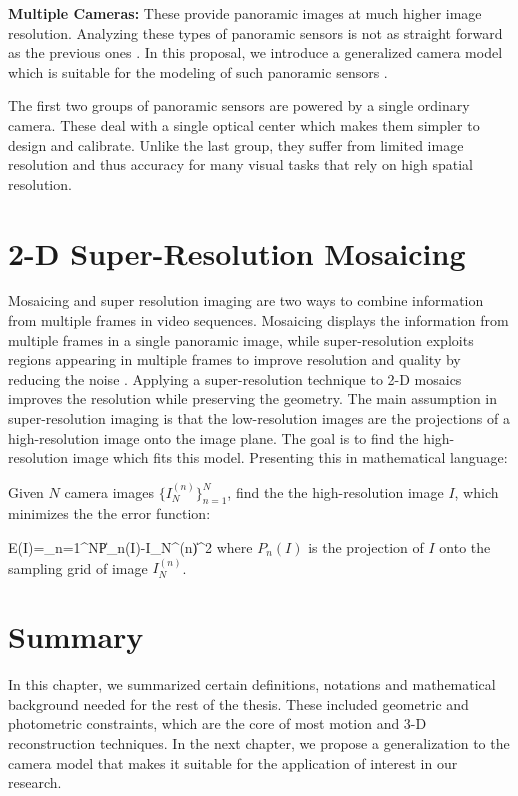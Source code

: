 \item {\bf Multiple Cameras:} These provide panoramic images at much higher image resolution.
Analyzing these types of panoramic sensors is not as straight forward as the previous ones
\cite{bak01,bak00,fer00,fir03-2,gro01,mcc97,nal98,neg01,ple03,swa00}. In this proposal, we
introduce a generalized camera model which is suitable for the modeling of such panoramic sensors
\cite{fir03-2}.

\ei

The first two groups of panoramic sensors are powered by a single ordinary camera. These deal with
a single optical center which makes them simpler to design and calibrate. Unlike the last group,
they suffer from limited image resolution and thus accuracy for many visual tasks that rely on
high spatial resolution.

\section{2-D Super-Resolution Mosaicing} Mosaicing and super resolution imaging are two ways
to combine information from multiple frames in video sequences. Mosaicing displays the information
from multiple frames in a single panoramic image, while super-resolution exploits regions appearing
in multiple frames to improve resolution and quality by reducing the noise \cite{zom00,zom01-1}.
Applying a super-resolution technique to 2-D mosaics improves the resolution while preserving the
geometry. The main assumption in super-resolution imaging is that the low-resolution images are the
projections of a high-resolution image onto the image plane. The goal is to find the
high-resolution image which fits this model. Presenting this in mathematical language:

Given $N$ camera images $\{I_N^{(n)}\}^N_{n=1}$, find the the high-resolution image $I$, which
minimizes the the error function:

\beq \D E(I)=\sum_{n=1}^N\left\|P_n(I)-I_N^{(n)}\right\|^2 \eeq where $P_n(I)$ is the projection of
$I$ onto the sampling grid of image $I_N^{(n)}$.

\section{Summary}
In this chapter, we summarized certain definitions, notations and mathematical background needed
for the rest of the thesis. These included geometric and photometric constraints, which are the
core of most motion and 3-D reconstruction techniques. In the next chapter, we propose a
generalization to the camera model that makes it suitable for the application of interest in our
research.

